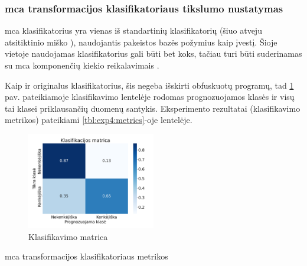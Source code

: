\subsubsection{\gls*{mca} transformacijos klasifikatoriaus tikslumo nustatymas}\label{sec:exp:4}

\gls{mca} klasifikatorius yra vienas iš standartinių klasifikatorių (šiuo atveju atsitiktinio miško ), naudojantis pakeistos bazės požymius kaip įvestį. Šioje vietoje naudojamas klasifikatorius gali būti bet koks, tačiau turi būti suderinamas su \gls{mca} komponenčių kiekio reikalavimais . 

Kaip ir originalus klasifikatorius, šis negeba išskirti obfuskuotų programų, tad \ref{fig:exp4:confusion} pav. pateikiamoje klasifikavimo lentelėje rodomas prognozuojamos klasės ir visų tai klasei priklausančių duomenų santykis.
Eksperimento rezultatai (klasifikavimo metrikos) pateikiami \ref{tbl:exp4:metrics}-oje lentelėje.
\begin{figure}[h]
    \centering
    \includegraphics[width=0.5\textwidth]{images/mca_2x2.png}
    \caption{Klasifikavimo matrica}
    \label{fig:exp4:confusion}
\end{figure}

\begin{table}[h]
    \caption{\gls{mca} transformacijos klasifikatoriaus metrikos}
    \centering
    \label{tbl:exp4:metrics}
\end{table}